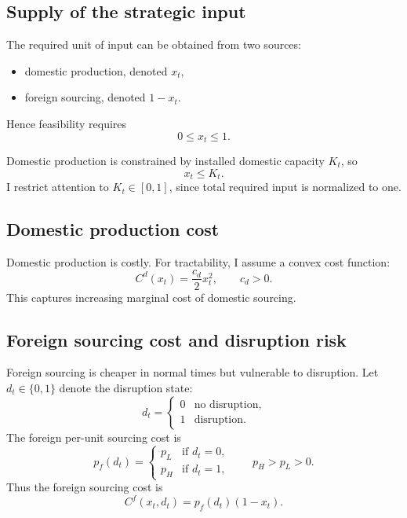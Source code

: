 \documentclass[11pt]{article}
\begin{document}
\subsection{Supply of the strategic input}

The required unit of input can be obtained from two sources:
\begin{itemize}[leftmargin=2em]
    \item domestic production, denoted $x_t$,
    \item foreign sourcing, denoted $1-x_t$.
\end{itemize}
Hence feasibility requires
\begin{equation}
0 \le x_t \le 1.
\end{equation}

Domestic production is constrained by installed domestic capacity $K_t$, so
\begin{equation}
x_t \le K_t.
\end{equation}
I restrict attention to $K_t \in [0,1]$, since total required input is normalized to one.

\subsection{Domestic production cost}

Domestic production is costly. For tractability, I assume a convex cost function:
\begin{equation}
C^d(x_t) = \frac{c_d}{2}x_t^2, \qquad c_d >0.
\end{equation}
This captures increasing marginal cost of domestic sourcing.

\subsection{Foreign sourcing cost and disruption risk}

Foreign sourcing is cheaper in normal times but vulnerable to disruption. Let $d_t \in \{0,1\}$ denote the disruption state:
\[
d_t =
\begin{cases}
0 & \text{no disruption},\\
1 & \text{disruption}.
\end{cases}
\]
The foreign per-unit sourcing cost is
\begin{equation}
p_f(d_t)=
\begin{cases}
p_L & \text{if } d_t=0,\\
p_H & \text{if } d_t=1,
\end{cases}
\qquad p_H>p_L>0.
\end{equation}
Thus the foreign sourcing cost is
\begin{equation}
C^f(x_t,d_t)=p_f(d_t)(1-x_t).
\end{equation}
\end{document}
